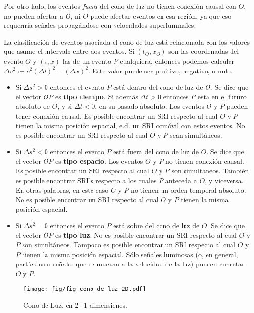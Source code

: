 Por otro lado, los eventos \textit{fuera} del cono de luz no tienen conexión causal con $O$, no pueden afectar a $O$, ni $O$ puede afectar eventos en esa región, ya que eso requeriría señales propagándose con velocidades superluminales.

La clasificación de eventos asociada el cono de luz está relacionada con los valores que asume el intervalo entre dos eventos. Si $(t_O,x_O)$ son las coordenadas del evento $O$ y $(t,x)$ las de un evento $P$ cualquiera, entonces podemos calcular $\Delta s^2:=c^2(\Delta t)^2-(\Delta x)^2$. Este valor puede ser positivo, negativo, o nulo.
\begin{itemize}
\item Si $\Delta s^2>0$ entonces el evento $P$ está dentro del cono de luz de $O$. Se dice que el vector $OP$ es \textbf{tipo tiempo}. Si además $\Delta t>0$ entonces $P$ está en el futuro absoluto de $O$, y si $\Delta t<0$, en su pasado absoluto. Los eventos $O$ y $P$ pueden tener conexión causal. Es posible encontrar un SRI respecto al cual $O$ y $P$ tienen la misma posición espacial, e.d. un SRI comóvil con estos eventos. No es posible encontrar un SRI respecto al cual $O$ y $P$ sean simultáneos.

\item Si $\Delta s^2<0$ entonces el evento $P$ está fuera del cono de luz de $O$. Se dice que el vector $OP$ es \textbf{tipo espacio}. Los eventos $O$ y $P$ no tienen conexión causal. Es posible encontrar un SRI respecto al cual $O$ y $P$ son simultáneos. También es posible encontrar SRI's respecto a los cuales $P$ anteceda a $O$, y viceversa. En otras palabras, en este caso $O$ y $P$ no tienen un orden temporal absoluto. No es posible encontrar un SRI respecto al cual $O$ y $P$ tienen la misma posición espacial.

\item Si $\Delta s^2=0$ entonces el evento $P$ está sobre del cono de luz de $O$. Se dice que el vector $OP$ es \textbf{tipo luz}. No es posible encontrar un SRI respecto al cual $O$ y $P$ son  simultáneos. Tampoco es posible encontrar un SRI respecto al cual $O$ y $P$ tienen la misma posición espacial. Sólo señales luminosas (o, en general, partículas o señales que se muevan a la velocidad de la luz) pueden conectar $O$ y $P$.
\end{itemize}

\begin{figure}[t]
\centering\texttt{[image: fig/fig-cono-de-luz-2D.pdf]}
\caption{Cono de Luz, en 2+1 dimensiones.}
\end{figure}



